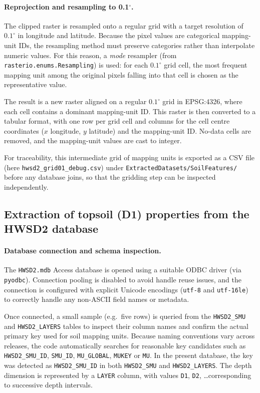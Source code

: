 \paragraph{Reprojection and resampling to 0.1$^{\circ}$.}

The clipped raster is resampled onto a regular grid with a target resolution of
$0.1^{\circ}$ in longitude and latitude. Because the pixel values are categorical
mapping-unit IDs, the resampling method must preserve categories rather than
interpolate numeric values. For this reason, a \emph{mode} resampler (from
\texttt{rasterio.enums.Resampling}) is used: for each $0.1^{\circ}$ grid cell,
the most frequent mapping unit among the original pixels falling into that cell
is chosen as the representative value.

The result is a new raster aligned on a regular $0.1^{\circ}$ grid in EPSG:4326,
where each cell contains a dominant mapping-unit ID. This raster is then
converted to a tabular format, with one row per grid cell and columns for the
cell centre coordinates ($x$ longitude, $y$ latitude) and the mapping-unit ID.
No-data cells are removed, and the mapping-unit values are cast to integer.

For traceability, this intermediate grid of mapping units is exported as a CSV
file (here \texttt{hwsd2\_grid01\_debug.csv}) under
\texttt{ExtractedDatasets/SoilFeatures/} before any database joins, so that the
gridding step can be inspected independently.

\subsection{Extraction of topsoil (D1) properties from the HWSD2 database}

\paragraph{Database connection and schema inspection.}

The \texttt{HWSD2.mdb} Access database is opened using a suitable ODBC driver
(via \texttt{pyodbc}). Connection pooling is disabled to avoid handle reuse
issues, and the connection is configured with explicit Unicode encodings
(\texttt{utf-8} and \texttt{utf-16le}) to correctly handle any non-ASCII field
names or metadata.

Once connected, a small sample (e.g.\ five rows) is queried from the
\texttt{HWSD2\_SMU} and \texttt{HWSD2\_LAYERS} tables to inspect their column
names and confirm the actual primary key used for soil mapping units. Because
naming conventions vary across releases, the code automatically searches for
reasonable key candidates such as \texttt{HWSD2\_SMU\_ID}, \texttt{SMU\_ID},
\texttt{MU\_GLOBAL}, \texttt{MUKEY} or \texttt{MU}. In the present database,
the key was detected as \texttt{HWSD2\_SMU\_ID} in both \texttt{HWSD2\_SMU} and
\texttt{HWSD2\_LAYERS}. The depth dimension is represented by a \texttt{LAYER}
column, with values \texttt{D1}, \texttt{D2}, \dots corresponding to successive
depth intervals.


